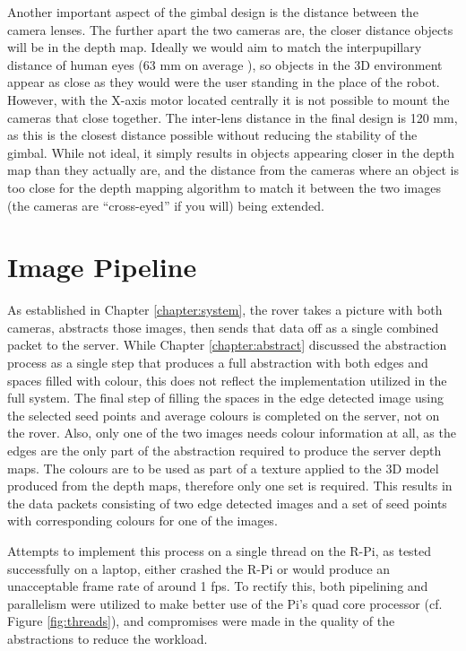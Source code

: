 Another important aspect of the gimbal design is the distance between the camera lenses. The further apart the two cameras are, the closer distance objects will be in the depth map. Ideally we would aim to match the interpupillary distance of human eyes (63 mm on average \cite{dodgson2004variation}), so objects in the 3D environment appear as close as they would were the user standing in the place of the robot. However, with the X-axis motor located centrally it is not possible to mount the cameras that close together. The inter-lens distance in the final design is 120 mm, as this is the closest distance possible without reducing the stability of the gimbal. While not ideal, it simply results in objects appearing closer in the depth map than they actually are, and the distance from the cameras where an object is too close for the depth mapping algorithm to match it between the two images (the cameras are ``cross-eyed'' if you will) being extended.

\section{Image Pipeline}
\label{Subsection:comms}

As established in Chapter \ref{chapter:system}, the rover takes a picture with both cameras, abstracts those images, then sends that data off as a single combined packet to the server. While Chapter \ref{chapter:abstract} discussed the abstraction process as a single step that produces a full abstraction with both edges and spaces filled with colour, this does not reflect the implementation utilized in the full system. The final step of filling the spaces in the edge detected image using the selected seed points and average colours is completed on the server, not on the rover. Also, only one of the two images needs colour information at all, as the edges are the only part of the abstraction required to produce the server depth maps. The colours are to be used as part of a texture applied to the 3D model produced from the depth maps, therefore only one set is required. This results in the data packets consisting of two edge detected images and a set of seed points with corresponding colours for one of the images.

Attempts to implement this process on a single thread on the R-Pi, as tested successfully on a laptop, either crashed the R-Pi or would produce an unacceptable frame rate of around 1 fps. To rectify this, both pipelining and parallelism were utilized to make better use of the Pi's quad core processor (cf. Figure \ref{fig:threads}), and compromises were made in the quality of the abstractions to reduce the workload.

